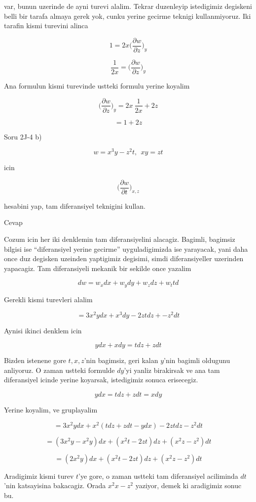 \documentclass[12pt,fleqn]{article}
\begin{document}
var, bunun uzerinde de ayni turevi alalim. Tekrar duzenleyip istedigimiz
degiskeni belli bir tarafa almaya gerek yok, cunku yerine gecirme teknigi
kullanmiyoruz. Iki tarafin kismi turevini alinca

\[ 1 = 2x  \bigg( \frac{\partial w}{\partial z}  \bigg)_y  \]

\[ \frac{ 1}{2x}  = \bigg( \frac{\partial w}{\partial z}  \bigg)_y  \]

Ana formulun kismi turevinde ustteki formulu yerine koyalim

\[  \bigg( \frac{\partial w}{\partial z}  \bigg)_y  =
2x \  \frac{1}{2x}  + 2z
 \]

\[   =
1 + 2z
 \]

Soru 2J-4 b)

\[ w = x^3y - z^2t, \ \ xy = zt\]

icin

\[ \bigg( \frac{\partial w}{\partial t}  \bigg)_{x,z}  \]

hesabini yap, tam diferansiyel teknigini kullan. 

Cevap

Cozum icin her iki denklemin tam diferansiyelini alacagiz. Bagimli,
bagimsiz bilgisi ise ``diferansiyel yerine gecirme'' uyguladigimizda ise
yarayacak, yani daha once duz degisken uzeinden yaptigimiz degisimi, simdi
diferansiyeller uzerinden yapacagiz. Tam diferansiyeli mekanik bir sekilde
once yazalim

\[ dw = w_x dx + w_y dy + w_z dz + w_t td \]

Gerekli kismi turevleri alalim

\[ = 3x^2y dx + x^3dy - 2zt dz + -z^2 dt\]

Aynisi ikinci denklem icin 

\[ y dx + x dy = t dz + z dt \]

Bizden istenene gore $t,x,z$'nin bagimsiz, geri kalan $y$'nin bagimli
oldugunu anliyoruz. O zaman ustteki formulde $dy$'yi yanliz birakirsak ve
ana tam diferansiyel icinde yerine koyarsak, istedigimiz sonuca
erisecegiz. 

\[ y dx  = t dz + z dt = x dy\]

Yerine koyalim, ve gruplayalim

\[ = 3x^2ydx + x^2(tdz + zdt - ydx) - 2ztdz - z^2dt \]

\[ = (3x^2y  - x^2y)dx + (x^2t-2zt)dz + (x^2z-z^2)dt  \]

\[ = (2x^2y) dx + (x^2t-2zt) dz + (x^2z-z^2)dt  \]

Aradigimiz kismi turev $t$'ye gore, o zaman ustteki tam diferansiyel
aciliminda $dt$'nin katsayisina bakacagiz. Orada $x^2x-z^2$ yaziyor, demek
ki aradigimiz sonuc bu. 
\end{document}
